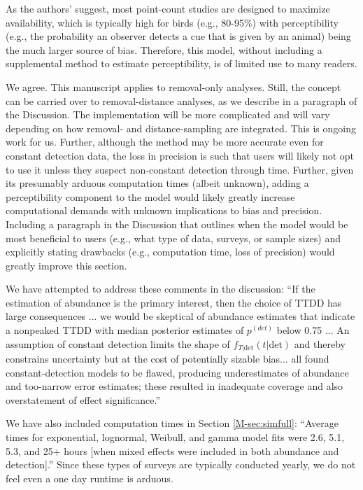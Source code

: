\documentclass[12pt]{article}
\renewenvironment{quote}  %
              {\list{}{\rightmargin\leftmargin}\normalfont%
               \item\relax}
              {\endlist}
\newcommand{\pdet}{p^{(det)}}
\newcommand{\dt}{\text{det}}
\newcommand{\ftdt}{f_{T|\dt}(t|\dt)}
\begin{document}
As the authors’ suggest, most point-count studies are designed to maximize availability, which is typically high for birds (e.g., 80-95\%) with perceptibility (e.g., the probability an observer detects a cue that is given by an animal) being the much larger source of bias.  Therefore, this model, without including a supplemental method to estimate perceptibility, is of limited use to many readers.
\begin{quote}
We agree.
This manuscript applies to removal-only analyses.
Still, the concept can be carried over to removal-distance analyses, as we describe in a paragraph of the Discussion.
The implementation will be more complicated and will vary depending on how removal- and distance-sampling are integrated.
This is ongoing work for us.
\end{quote}
Further, although the method may be more accurate even for constant detection data, the loss in precision is such that users will likely not opt to use it unless they suspect non-constant detection through time.  Further, given its presumably arduous computation times (albeit unknown), adding a perceptibility component to the model would likely greatly increase computational demands with unknown implications to bias and precision.  Including a paragraph in the Discussion that outlines when the model would be most beneficial to users (e.g., what type of data, surveys, or sample sizes) and explicitly stating drawbacks (e.g., computation time, loss of precision) would greatly improve this section.  
\begin{quote}
We have attempted to address these comments in the discussion:
``If the estimation of abundance is the primary interest, 
then the choice of TTDD has large consequences ... we would be skeptical of 
abundance estimates that indicate a nonpeaked TTDD with median posterior 
estimates of $\pdet$ below 0.75 ...
An assumption of constant detection limits the shape of $\ftdt$ and 
thereby constrains uncertainty but at the cost of potentially sizable bias...
all found constant-detection models to be flawed, 
producing underestimates of abundance and too-narrow error estimates; 
these resulted in inadequate coverage and also overstatement of effect 
significance.''

We have also included computation times in Section \ref{M-sec:simfull}: 
``Average times for exponential, lognormal, Weibull, and gamma model fits were 
2.6, 5.1, 5.3, and 25+ hours [when mixed effects were included in both abundance 
and detection].'' Since these types of surveys are typically conducted yearly, 
we do not feel even a one day runtime is arduous.
\end{quote}
\end{document}
